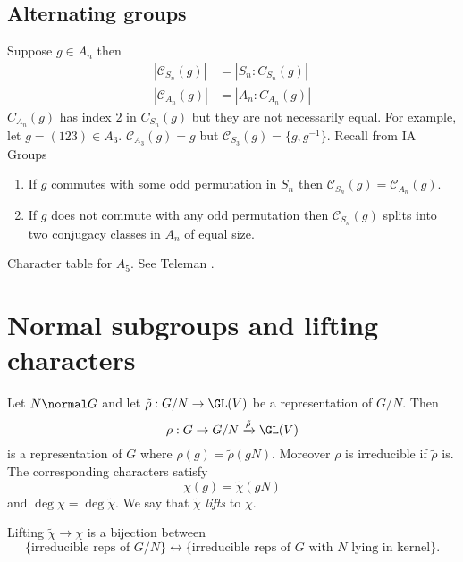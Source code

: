 \documentclass[a4paper]{article}
\begin{document}
\subsection{Alternating groups}

Suppose \(g \in A_n\) then
\begin{align*}
  |\mathcal C_{S_n}(g)| &= |S_n : C_{S_n}(g)| \\
  |\mathcal C_{A_n}(g)| &= |A_n : C_{A_n}(g)|
\end{align*}
\(C_{A_n}(g)\) has index \(2\) in \(C_{S_n}(g)\) but they are not necessarily equal. For example, let \(g = (123) \in A_3\). \(\mathcal C_{A_3} (g) = g\) but \(\mathcal C_{S_3}(g) = \{g, g^{-1}\}\). Recall from IA Groups

\begin{lemma}\leavevmode
  \begin{enumerate}
  \item If \(g\) commutes with some odd permutation in \(S_n\) then \(\mathcal C_{S_n}(g) = \mathcal C_{A_n}(g)\).
  \item If \(g\) does not commute with any odd permutation then \(\mathcal C_{S_n}(g)\) splits into two conjugacy classes in \(A_n\) of equal size.
  \end{enumerate}
\end{lemma}

\begin{ex}
  Character table for \(A_5\). See Teleman .
\end{ex}

\section{Normal subgroups and lifting characters}

\begin{lemma}[lifting]
  \label{lemma:lifting}
  Let \(N \normal G\) and let \(\tilde \rho: G/N \to \GL(V)\) be a representation of \(G/N\). Then
  \[
    \rho: G \to G/N \xrightarrow{\tilde \rho} \GL(V)
  \]
  is a representation of \(G\) where \(\rho(g) = \tilde \rho (gN)\). Moreover \(\rho\) is irreducible if \(\tilde \rho\) is. The corresponding characters satisfy
  \[
    \chi(g) = \tilde \chi(gN)
  \]
  and \(\deg \chi = \deg \tilde \chi\). We say that \(\tilde \chi\) \emph{lifts} to \(\chi\).

  Lifting \(\tilde \chi \to \chi\) is a bijection between
  \[
    \{\text{irreducible reps of \(G/N\)}\} \leftrightarrow \{\text{irreducible reps of \(G\) with \(N\) lying in kernel}\}.
  \]
\end{lemma}
\end{document}
